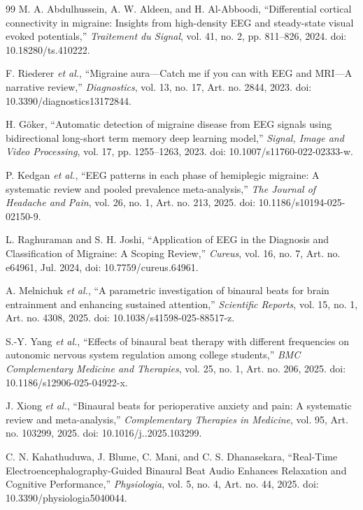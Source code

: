 \documentclass[12pt, a4paper]{report}
\begin{document}
\begin{thebibliography}{99}
M. A. Abdulhussein, A. W. Aldeen, and H. Al-Abboodi, ``Differential cortical connectivity in migraine: Insights from high-density EEG and steady-state visual evoked potentials,'' \textit{Traitement du Signal}, vol. 41, no. 2, pp. 811--826, 2024. doi: 10.18280/ts.410222.

F. Riederer \textit{et al.}, ``Migraine aura---Catch me if you can with EEG and MRI---A narrative review,'' \textit{Diagnostics}, vol. 13, no. 17, Art. no. 2844, 2023. doi: 10.3390/diagnostics13172844.


H. G\"oker, ``Automatic detection of migraine disease from EEG signals using bidirectional long-short term memory deep learning model,'' \textit{Signal, Image and Video Processing}, vol. 17, pp. 1255--1263, 2023. doi: 10.1007/s11760-022-02333-w.

P. Kedgan \textit{et al.}, ``EEG patterns in each phase of hemiplegic migraine: A systematic review and pooled prevalence meta-analysis,'' \textit{The Journal of Headache and Pain}, vol. 26, no. 1, Art. no. 213, 2025. doi: 10.1186/s10194-025-02150-9.


L. Raghuraman and S. H. Joshi, ``Application of EEG in the Diagnosis and Classification of Migraine: A Scoping Review,'' \textit{Cureus}, vol. 16, no. 7, Art. no. e64961, Jul. 2024, doi: 10.7759/cureus.64961.




A. Melnichuk \textit{et al.}, ``A parametric investigation of binaural beats for brain entrainment and enhancing sustained attention,'' \textit{Scientific Reports}, vol. 15, no. 1, Art. no. 4308, 2025. doi: 10.1038/s41598-025-88517-z.

S.-Y. Yang \textit{et al.}, ``Effects of binaural beat therapy with different frequencies on autonomic nervous system regulation among college students,'' \textit{BMC Complementary Medicine and Therapies}, vol. 25, no. 1, Art. no. 206, 2025. doi: 10.1186/s12906-025-04922-x.

J. Xiong \textit{et al.}, ``Binaural beats for perioperative anxiety and pain: A systematic review and meta-analysis,'' \textit{Complementary Therapies in Medicine}, vol. 95, Art. no. 103299, 2025. doi: 10.1016/j..2025.103299.

C. N. Kahathuduwa, J. Blume, C. Mani, and C. S. Dhanasekara, ``Real-Time Electroencephalography-Guided Binaural Beat Audio Enhances Relaxation and Cognitive Performance,'' \textit{Physiologia}, vol. 5, no. 4, Art. no. 44, 2025. doi: 10.3390/physiologia5040044.



\end{thebibliography}
\end{document}
